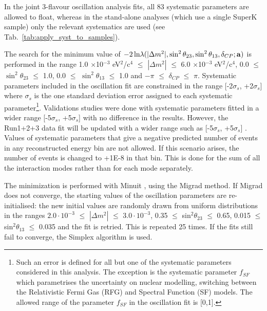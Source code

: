 In the joint 3-flavour oscillation analysis fits, all 83 systematic parameters are allowed to float, whereas 
in the stand-alone analyses (which use a single SuperK sample) only the relevant systematics are used (see Tab.\ \ref{tab:apply_syst_to_samples}).

The search for the minimum value of 
$-2 \, \textrm{ln} \lambda(|\Delta m^{2}|, \sin^{2}\theta_{23}, \sin^{2}\theta_{13}, \delta_{CP}; {\bf a})$
is performed in the range 
1.0 $\times$10$^{-3}$ eV$^{2}$/c$^{4}$ $\leq$ $|\Delta m^{2}|$ $\leq$ 6.0 $\times$10$^{-3}$ eV$^{2}$/c$^{4}$,
0.0 $\leq$ $\sin^{2}\theta_{23}$ $\leq$ 1.0,
0.0 $\leq$ $\sin^{2}\theta_{13}$ $\leq$ 1.0 and
$-\pi$ $\leq$ $\delta_{CP}$ $\leq$ $\pi$.
Systematic parameters included in the oscillation fit are constrained in the range [-2$\sigma_{s}$, +2$\sigma_{s}$]
where $\sigma_{s}$ is the one standard deviation error assigned to each systematic parameter\footnote{
 Such an error is defined for all but one of the systematic parameters considered in this analysis. 
 The exception is the systematic parameter $f_{SF}$ which parametrises the uncertainty on nuclear modelling, 
 switching between the Relativistic Fermi Gas (RFG) and Spectral Function (SF) models. The allowed range of the parameter $f_{SF}$ 
in the oscillation fit is [0,1].}. Validations studies were done with systematic parameters fitted in a wider range 
[-5$\sigma_{s}$, +5$\sigma_{s}$] with no difference in the results. However, the Run1+2+3 data fit will be updated with
a wider range such as [-5$\sigma_{s}$, +5$\sigma_{s}$] . 
Values of systematic parameters that give a negative predicted number of events in any reconstructed energy bin are not allowed. 
If this scenario arises, the number of events is changed to +1E-8 in that bin. This is done for the sum of all the interaction 
modes rather than for each mode separately.

The minimization is performed with Minuit \cite{Minuit}, using the Migrad method.
If Migrad does not converge, the starting values of the oscillation parameters are re-initialised:
the new initial values are randomly drawn from uniform distributions in the ranges 
$2.0 \cdot 10^{-3}$ $\leq$ $|\Delta m^{2}|$ $\leq$ $3.0 \cdot 10^{-3}$,
0.35 $\leq$ sin$^{2}\theta_{23}$ $\leq$ 0.65, 
0.015 $\leq$ sin$^{2}\theta_{13}$ $\leq$ 0.035
and the fit is retried. This is repeated 25 times.
If the fits still fail to converge, the Simplex algorithm is used.

%

